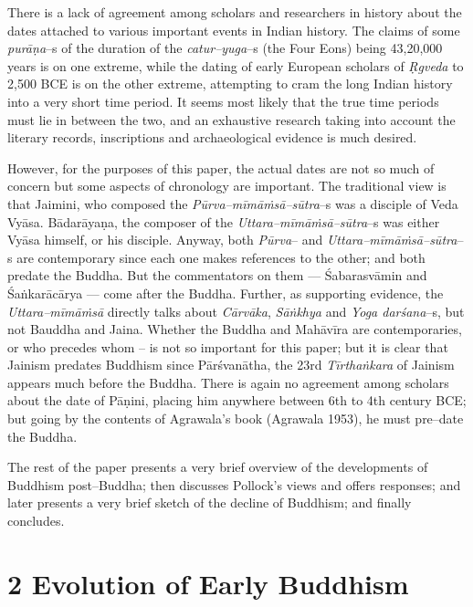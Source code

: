 There is a lack of agreement among scholars and researchers in history about the dates attached to various important events in Indian history. The claims of some \textit{purāṇa}–s of the duration of the \textit{catur–yuga}–s (the Four Eons) being 43,20,000 years is on one extreme, while the dating of early European scholars of \textit{Ṛgveda} to 2,500 BCE is on the other extreme, attempting to cram the long Indian history into a very short time period. It seems most likely that the true time periods must lie in between the two, and an exhaustive research taking into account the literary records, inscriptions and archaeological evidence is much desired.

However, for the purposes of this paper, the actual dates are not so much of concern but some aspects of chronology are important. The traditional view is that Jaimini, who composed the \textit{Pūrva–mīmāṁsā–sūtra}–s was a disciple of Veda Vyāsa. Bādarāyaṇa, the composer of the \textit{Uttara–mīmāṁsā–sūtra}–s was either Vyāsa himself, or his disciple. Anyway, both \textit{Pūrva}– and \textit{Uttara–mīmāṁsā–sūtra}–s are contemporary since each one makes references to the other; and both predate the Buddha. But the commentators on them — Śabarasvāmin and Śaṅkarācārya — come after the Buddha. Further, as supporting evidence, the \textit{Uttara–mīmāṁsā} directly talks about \textit{Cārvāka}, \textit{Sāṅkhya} and \textit{Yoga darśana}–s, but not Bauddha and Jaina. Whether the Buddha and Mahāvīra are contemporaries, or who precedes whom – is not so important for this paper; but it is clear that Jainism predates Buddhism since Pārśvanātha, the 23rd \textit{Tīrthaṅkara} of Jainism appears much before the Buddha. There is again no agreement among scholars about the date of Pāṇini, placing him anywhere between 6th to 4th century BCE; but going by the contents of Agrawala’s book (Agrawala 1953), he must pre–date the Buddha.

The rest of the paper presents a very brief overview of the developments of Buddhism post–Buddha; then discusses Pollock’s views and offers responses; and later presents a very brief sketch of the decline of Buddhism; and finally concludes.


\section*{2 Evolution of Early Buddhism}

